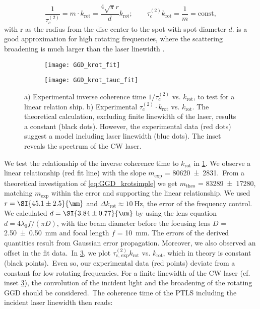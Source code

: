 \begin{equation}\label{eq:GGD_krotsimple}
	\dfrac{1}{\tau_c^{(2)}}=m\cdot k_\mathrm{rot}=\dfrac{4\sqrt{\pi}r}{d}k_\mathrm{rot};\qquad\tau_c^{(2)} k_\mathrm{rot}=\dfrac{1}{m}=\textrm{const}, 
\end{equation}
with r as the radius from the disc center to the spot with spot diameter $d$.  is a good approximation for high rotating frequencies, where the scattering broadening is much larger than the laser linewidth \cite{huang_measuring_2016}.
\begin{figure}[htp]
	\centering	
	\begin{subfigure}{0.49\linewidth}
		\centering
		\texttt{[image: GGD\_krot\_fit]}
		\caption{}
		\label{fig:krotfit}
	\end{subfigure}
	\hfill
	\begin{subfigure}{0.485\linewidth}
		\centering
		\texttt{[image: GGD\_krot\_tauc\_fit]}
		\caption{}
		\label{fig:GGD_krot_tauc_fit}
	\end{subfigure}
	\caption{a) Experimental inverse coherence time $1/\tau_c^{(2)}$ vs. $k_\mathrm{rot}$, to test for a linear relation ship. b) Experimental $\tau_c^{(2)}\cdot k_\mathrm{rot}$ vs. $k_\mathrm{rot}$. The theoretical calculation, excluding finite linewidth of the laser, results a constant (black dots). However, the experimental data (red dots) suggest a model including laser linewidth (blue dots). The inset reveals the spectrum of the \ac{CW} laser.}
\end{figure}
\noindent We test the relationship of the inverse coherence time to $k_\mathrm{rot}$ in \cref{fig:krotfit}. We observe a linear relationship (red fit line) with the slope $m_\mathrm{exp}$ = \SI{80620\pm2831}{}.~From a theoretical investigation of \cref{eq:GGD_krotsimple} we get $m_\mathrm{theo}$ = \SI{83289\pm17280}{}, matching $m_\mathrm{exp}$ within the error and supporting the linear relationship. We used $r=\SI{45.1\pm2.5}{\mm}$ and $\Delta k_\mathrm{rot}\approx\SI{10}{\Hz}$, the error of the frequency control. We calculated $d=\SI{3.84\pm0.77}{\um}$ by using the lens equation $d=4\lambda_0 f/(\pi D)$, with the beam diameter before the focusing lens $D$ = \SI{2.50\pm0.50}{\mm} and focal length $f$ = \SI{10}{\mm}. The errors of the derived quantities result from Gaussian error propagation. Moreover, we also observed an offset in the fit data.~In \cref{fig:GGD_krot_tauc_fit}, we plot $\tau_\mathrm{c,\, exp}^{(2)} k_\mathrm{rot}$ vs. $k_\mathrm{rot}$, which in theory is constant (black points).~Even so, our experimental data (red points) deviate from a constant for low rotating frequencies. For a finite linewidth of the \ac{CW} laser (cf. inset \cref{fig:GGD_krot_tauc_fit}), the convolution of the incident light and the broadening of the rotating \ac{GGD} should be considered.~The coherence time of the \Ac{PTLS} including the incident laser linewidth then reads:
